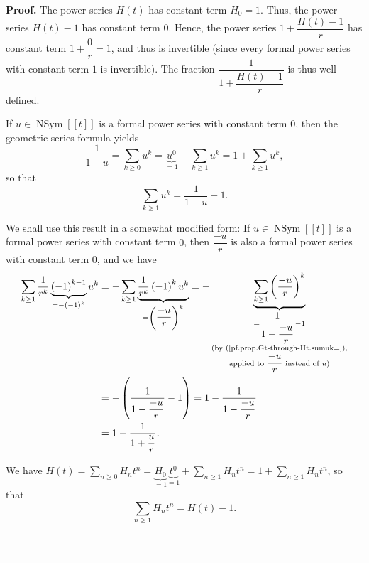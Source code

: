 \documentclass[numbers=enddot,12pt,final,onecolumn,notitlepage]{scrartcl}%
\theoremstyle{definition}
\newenvironment{proof}[1][Proof]{\noindent\textbf{#1.} }{\ \rule{0.5em}{0.5em}}
\let\sumnonlimits\sum
\renewcommand{\sum}{\sumnonlimits\limits}
\begin{document}
\begin{proof}
The power series $H\left(  t\right)  $ has constant term $H_{0}=1$. Thus, the
power series $H\left(  t\right)  -1$ has constant term $0$. Hence, the power
series $1+\dfrac{H\left(  t\right)  -1}{r}$ has constant term $1+\dfrac{0}%
{r}=1$, and thus is invertible (since every formal power series with constant
term $1$ is invertible). The fraction $\dfrac{1}{1+\dfrac{H\left(  t\right)
-1}{r}}$ is thus well-defined.

If $u\in\operatorname*{NSym}\left[  \left[  t\right]  \right]  $ is a formal
power series with constant term $0$, then the geometric series formula yields%
\[
\dfrac{1}{1-u}=\sum_{k\geq0}u^{k}=\underbrace{u^{0}}_{=1}+\sum_{k\geq1}%
u^{k}=1+\sum_{k\geq1}u^{k},
\]
so that%
\begin{equation}
\sum_{k\geq1}u^{k}=\dfrac{1}{1-u}-1. \label{pf.prop.Gt-through-Ht.sumuk=}%
\end{equation}


We shall use this result in a somewhat modified form: If $u\in
\operatorname*{NSym}\left[  \left[  t\right]  \right]  $ is a formal power
series with constant term $0$, then $\dfrac{-u}{r}$ is also a formal power
series with constant term $0$, and we have%
\begin{align}
\sum_{k\geq1}\dfrac{1}{r^{k}}\underbrace{\left(  -1\right)  ^{k-1}}_{=-\left(
-1\right)  ^{k}}u^{k}  &  =-\sum_{k\geq1}\underbrace{\dfrac{1}{r^{k}}\left(
-1\right)  ^{k}u^{k}}_{=\left(  \dfrac{-u}{r}\right)  ^{k}}=-\underbrace{\sum
_{k\geq1}\left(  \dfrac{-u}{r}\right)  ^{k}}_{\substack{=\dfrac{1}%
{1-\dfrac{-u}{r}}-1\\\text{(by (\ref{pf.prop.Gt-through-Ht.sumuk=}%
),}\\\text{applied to }\dfrac{-u}{r}\text{ instead of }u\text{)}}}\nonumber\\
&  =-\left(  \dfrac{1}{1-\dfrac{-u}{r}}-1\right)  =1-\dfrac{1}{1-\dfrac{-u}%
{r}}\nonumber\\
&  =1-\dfrac{1}{1+\dfrac{u}{r}}. \label{pf.prop.Gt-through-Ht.sum-uk=}%
\end{align}


We have $H\left(  t\right)  =\sum_{n\geq0}H_{n}t^{n}=\underbrace{H_{0}}%
_{=1}\underbrace{t^{0}}_{=1}+\sum_{n\geq1}H_{n}t^{n}=1+\sum_{n\geq1}H_{n}%
t^{n}$, so that%
\[
\sum_{n\geq1}H_{n}t^{n}=H\left(  t\right)  -1.
\]



\end{proof}
\end{document}
